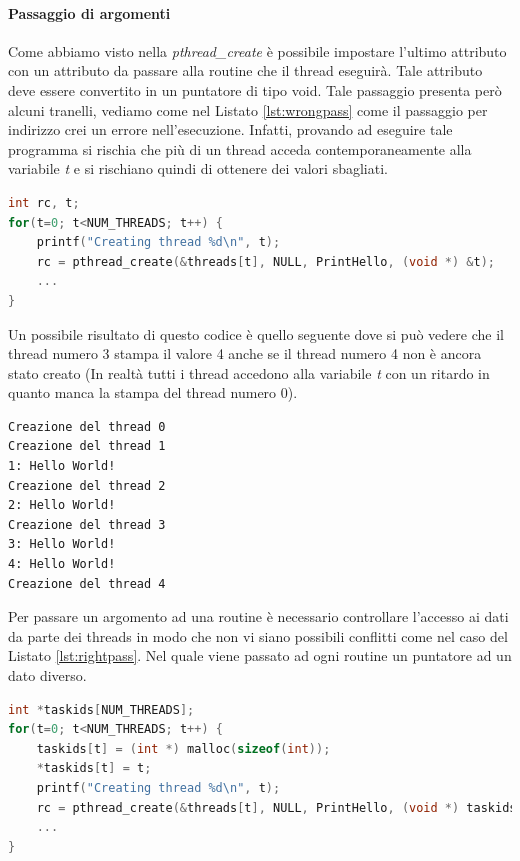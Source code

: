 \paragraph{Passaggio di argomenti}
Come abbiamo visto nella \emph{pthread\_create} è possibile impostare l'ultimo attributo con un attributo da passare alla routine che il thread eseguirà. Tale attributo deve essere convertito in un puntatore di tipo void. Tale passaggio presenta però alcuni tranelli, vediamo come nel  Listato \ref{lst:wrongpass} come il passaggio per indirizzo crei un errore nell'esecuzione. Infatti, provando ad eseguire tale programma si rischia che più di un thread acceda contemporaneamente alla variabile \emph{t} e si rischiano quindi di ottenere dei valori sbagliati.
\begin{lstlisting}[language=C,caption={Errore nel passaggio di argomenti ad un thread},label=lst:wrongpass]
int rc, t;
for(t=0; t<NUM_THREADS; t++) {
	printf("Creating thread %d\n", t);
	rc = pthread_create(&threads[t], NULL, PrintHello, (void *) &t);
	...
}
\end{lstlisting}
Un possibile risultato di questo codice è quello seguente dove si può vedere che il thread numero 3 stampa il valore 4 anche se il thread numero 4 non è ancora stato creato (In realtà tutti i thread accedono alla variabile \emph{t} con un ritardo in quanto manca la stampa del thread numero 0).
\begin{verbatim}
Creazione del thread 0
Creazione del thread 1
1: Hello World!
Creazione del thread 2
2: Hello World!
Creazione del thread 3
3: Hello World!
4: Hello World!
Creazione del thread 4
\end{verbatim}
Per passare un argomento ad una routine è necessario controllare l'accesso ai dati da parte dei threads in modo che non vi siano possibili conflitti come nel caso del  Listato \ref{lst:rightpass}. Nel quale viene passato ad ogni routine un puntatore ad un dato diverso.
\begin{lstlisting}[language=C,caption={Metodo corretto nel passaggio di argomenti ad un thread},label=lst:rightpass]
int *taskids[NUM_THREADS];
for(t=0; t<NUM_THREADS; t++) {
	taskids[t] = (int *) malloc(sizeof(int));
	*taskids[t] = t;
	printf("Creating thread %d\n", t);
	rc = pthread_create(&threads[t], NULL, PrintHello, (void *) taskids[t]);
	...
}
\end{lstlisting}
